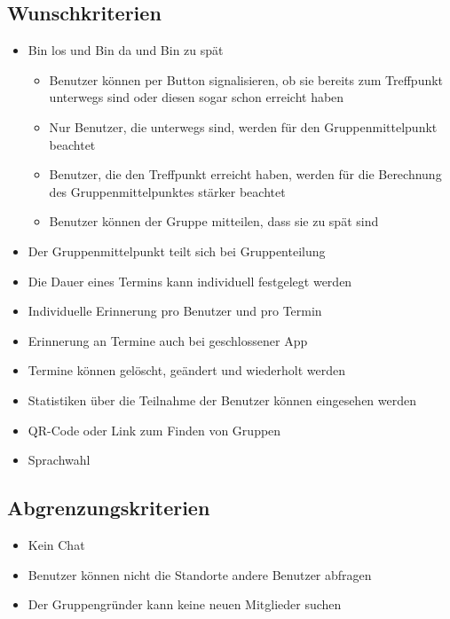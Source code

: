 \documentclass{scrartcl}
\begin{document}
	\subsection{Wunschkriterien}
	\begin{itemize}
		\item \glqq{}Bin los\grqq{} und \glqq{}Bin da\grqq{} und \glqq{}Bin zu spät\grqq{}
		\begin{itemize}
			\item Benutzer können per Button signalisieren, ob sie bereits zum Treffpunkt unterwegs sind oder diesen sogar schon erreicht haben
			\item Nur Benutzer, die unterwegs sind, werden für den Gruppenmittelpunkt beachtet
			\item Benutzer, die den Treffpunkt erreicht haben, werden für die Berechnung des Gruppenmittelpunktes stärker beachtet
			\item Benutzer können der Gruppe mitteilen, dass sie zu spät sind
		\end{itemize}
		\item Der Gruppenmittelpunkt teilt sich bei Gruppenteilung
		\item Die Dauer eines Termins kann individuell festgelegt werden
		\item Individuelle Erinnerung pro Benutzer und pro Termin
		\item Erinnerung an Termine auch bei geschlossener App
		\item Termine können gelöscht, geändert und wiederholt werden
		\item Statistiken über die Teilnahme der Benutzer können eingesehen werden
		\item QR-Code oder Link zum Finden von Gruppen
		\item Sprachwahl
	\end{itemize}
	\subsection{Abgrenzungskriterien}
	\begin{itemize}
		\item Kein Chat
		\item Benutzer können nicht die Standorte andere Benutzer abfragen
		\item Der Gruppengründer kann keine neuen Mitglieder suchen
	\end{itemize}

	\newpage
	
	
	
\end{document}
